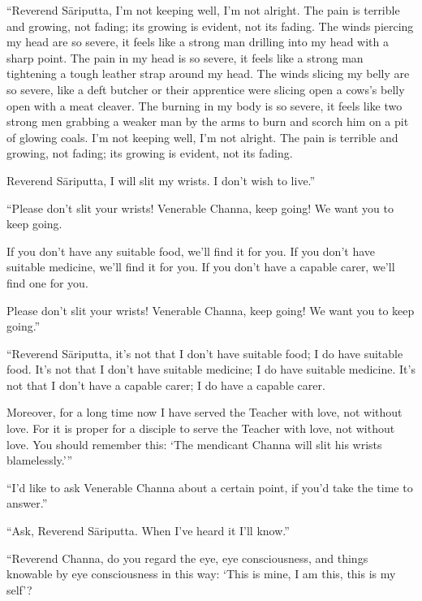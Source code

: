 \documentclass[12pt,openany]{book}%
\begin{document}
“Reverend \textsanskrit{Sāriputta}, I’m not keeping well, I’m not alright. The pain is terrible and growing, not fading; its growing is evident, not its fading. The winds piercing my head are so severe, it feels like a strong man drilling into my head with a sharp point. The pain in my head is so severe, it feels like a strong man tightening a tough leather strap around my head. The winds slicing my belly are so severe, like a deft butcher or their apprentice were slicing open a cows’s belly open with a meat cleaver. The burning in my body is so severe, it feels like two strong men grabbing a weaker man by the arms to burn and scorch him on a pit of glowing coals. I’m not keeping well, I’m not alright. The pain is terrible and growing, not fading; its growing is evident, not its fading. 

Reverend \textsanskrit{Sāriputta}, I will slit my wrists. I don’t wish to live.” 

“Please don’t slit your wrists! Venerable Channa, keep going! We want you to keep going. 

If you don’t have any suitable food, we’ll find it for you. If you don’t have suitable medicine, we’ll find it for you. If you don’t have a capable carer, we’ll find one for you. 

Please don’t slit your wrists! Venerable Channa, keep going! We want you to keep going.” 

“Reverend \textsanskrit{Sāriputta}, it’s not that I don’t have suitable food; I do have suitable food. It’s not that I don’t have suitable medicine; I do have suitable medicine. It’s not that I don’t have a capable carer; I do have a capable carer. 

Moreover, for a long time now I have served the Teacher with love, not without love. For it is proper for a disciple to serve the Teacher with love, not without love. You should remember this: ‘The mendicant Channa will slit his wrists blamelessly.’” 

“I’d like to ask Venerable Channa about a certain point, if you’d take the time to answer.” 

“Ask, Reverend \textsanskrit{Sāriputta}. When I’ve heard it I’ll know.” 

“Reverend Channa, do you regard the eye, eye consciousness, and things knowable by eye consciousness in this way: ‘This is mine, I am this, this is my self’? 
\end{document}
